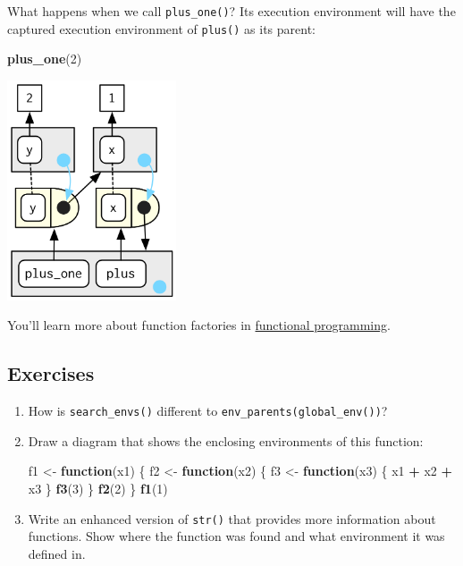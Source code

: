 \documentclass[]{book}
\newenvironment{Shaded}{\begin{snugshade}}{\end{snugshade}}
\newcommand{\ControlFlowTok}[1]{\textcolor[rgb]{0.13,0.29,0.53}{\textbf{#1}}}
\newcommand{\DecValTok}[1]{\textcolor[rgb]{0.00,0.00,0.81}{#1}}
\newcommand{\KeywordTok}[1]{\textcolor[rgb]{0.13,0.29,0.53}{\textbf{#1}}}
\newcommand{\NormalTok}[1]{#1}
\newcommand{\OperatorTok}[1]{\textcolor[rgb]{0.81,0.36,0.00}{\textbf{#1}}}
\newcommand{\StringTok}[1]{\textcolor[rgb]{0.31,0.60,0.02}{#1}}
\theoremstyle{definition}
\theoremstyle{definition}
\theoremstyle{definition}
\theoremstyle{remark}
\begin{document}
What happens when we call \texttt{plus\_one()}? Its execution
environment will have the captured execution environment of
\texttt{plus()} as its parent:

\begin{Shaded}
\begin{Highlighting}[]
\KeywordTok{plus_one}\NormalTok{(}\DecValTok{2}\NormalTok{)}
\end{Highlighting}
\end{Shaded}

\begin{center}\includegraphics[width=1.97in]{diagrams/environments/closure-call} \end{center}

You'll learn more about function factories in
\protect\hyperlink{functional-programming}{functional programming}.

\hypertarget{exercises-8}{%
\subsection{Exercises}\label{exercises-8}}

\begin{enumerate}
\def\labelenumi{\arabic{enumi}.}
\item
  How is \texttt{search\_envs()} different to
  \texttt{env\_parents(global\_env())}?
\item
  Draw a diagram that shows the enclosing environments of this function:

\begin{Shaded}
\begin{Highlighting}[]
\NormalTok{f1 <-}\StringTok{ }\ControlFlowTok{function}\NormalTok{(x1) \{}
\NormalTok{  f2 <-}\StringTok{ }\ControlFlowTok{function}\NormalTok{(x2) \{}
\NormalTok{    f3 <-}\StringTok{ }\ControlFlowTok{function}\NormalTok{(x3) \{}
\NormalTok{      x1 }\OperatorTok{+}\StringTok{ }\NormalTok{x2 }\OperatorTok{+}\StringTok{ }\NormalTok{x3}
\NormalTok{    \}}
    \KeywordTok{f3}\NormalTok{(}\DecValTok{3}\NormalTok{)}
\NormalTok{  \}}
  \KeywordTok{f2}\NormalTok{(}\DecValTok{2}\NormalTok{)}
\NormalTok{\}}
\KeywordTok{f1}\NormalTok{(}\DecValTok{1}\NormalTok{)}
\end{Highlighting}
\end{Shaded}
\item
  Write an enhanced version of \texttt{str()} that provides more
  information about functions. Show where the function was found and
  what environment it was defined in.
\end{enumerate}
\end{document}
